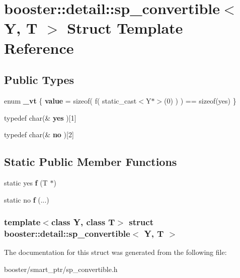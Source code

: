 \section{booster\-:\-:detail\-:\-:sp\-\_\-convertible$<$ \-Y, \-T $>$ \-Struct \-Template \-Reference}
\label{structbooster_1_1detail_1_1sp__convertible}
\subsection*{\-Public \-Types}
\begin{DoxyCompactItemize}
\item 
enum {\bfseries \-\_\-vt} \{ {\bfseries value} =  sizeof( f( static\-\_\-cast$<$\-Y$\ast$$>$(0) ) ) == sizeof(yes)
 \}
\item 
typedef char(\& {\bfseries yes} )[1]\label{structbooster_1_1detail_1_1sp__convertible_abf5d3f8771631a523e49fa22b835c1d1}

\item 
typedef char(\& {\bfseries no} )[2]\label{structbooster_1_1detail_1_1sp__convertible_abe647cfa9f7eedbf8a48bd3885459808}

\end{DoxyCompactItemize}
\subsection*{\-Static \-Public \-Member \-Functions}
\begin{DoxyCompactItemize}
\item 
static yes {\bfseries f} (\-T $\ast$)\label{structbooster_1_1detail_1_1sp__convertible_a42352ce32a2cba6574f8422e875bce15}

\item 
static no {\bfseries f} (...)\label{structbooster_1_1detail_1_1sp__convertible_a87c0d2328ecc1cee456147ab904d2328}

\end{DoxyCompactItemize}
\subsubsection*{template$<$class Y, class T$>$ struct booster\-::detail\-::sp\-\_\-convertible$<$ Y, T $>$}



\-The documentation for this struct was generated from the following file\-:\begin{DoxyCompactItemize}
\item 
booster/smart\-\_\-ptr/sp\-\_\-convertible.\-h\end{DoxyCompactItemize}
